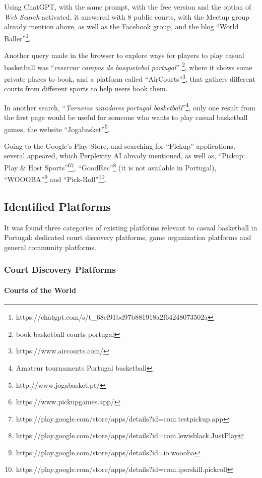 Using ChatGPT, with the same prompt, with the free version and the option of \textit{Web Search} activated, it answered with 8 public courts, with the Meetup group already mention above, as well as the Facebook group, and the blog ``World Baller''\footnote{https://chatgpt.com/s/t\_68ef91bd97b881918a2f64248073502a}.

Another query made in the browser to explore ways for players to play casual basketball was ``\textit{reservar campos de basquetebol portugal}'' \footnote{book basketball courts portugal}, where it shows some private places to book, and a platform called ``AirCourts''\footnote{https://www.aircourts.com/}, that gathers different courts from different sports to help users book them.

In another search, ``\textit{Torneios amadores portugal basketball}''\footnote{Amateur tournaments Portugal basketball}, only one result from the first page would be useful for someone who wants to play casual basketball games, the website ``Jogabasket''\footnote{http://www.jogabasket.pt/}.

Going to the Google's Play Store, and searching for ``Pickup'' applications, several appeared, which Perplexity AI already mentioned, as well as, ``Pickup: Play \& Host Sports''\footnote{https://www.pickupgames.app/}\footnote{https://play.google.com/store/apps/details?id=com.testpickup.app}, ``GoodRec''\footnote{https://play.google.com/store/apps/details?id=com.lewisblack.JustPlay} (it is not available in Portugal), ``WOOOBA''\footnote{https://play.google.com/store/apps/details?id=io.woooba} and ``Pick-Roll''\footnote{https://play.google.com/store/apps/details?id=com.iperskill.pickroll}.

\subsection{Identified Platforms}

It was found three categories of existing platforms relevant to casual basketball in Portugal: dedicated court discovery platforms, game organization platforms and general community platforms.

\subsubsection{Court Discovery Platforms}

\paragraph{\textbf{Courts of the World}}

